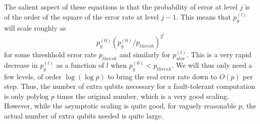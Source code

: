\documentclass{report}
\newcommand{\pgj}[1]{p_g^{({#1})}}
\newcommand{\psj}[1]{p_{stor}^{({#1})}}
\begin{document}
The salient aspect of these equations is that the probability of error at 
level $j$ is of the order of the square of the error rate at level $j-1$.  This 
means that $\pgj{l}$ will scale roughly as 
\begin{equation}
\pgj{0} (\pgj{0}/p_{thresh})^{2^l}
\end{equation}
for some threshhold error rate $p_{thresh}$ and 
similarly for $\psj{l}$.  This is a very rapid decrease in $\pgj{l}$ as a 
function of $l$ when $\pgj{0} < p_{thresh}$.  We will thus only need a few 
levels, of order $\log (\log p)$ to bring the real error rate down to $O(p)$ 
per step.  Thus, the number of extra qubits necessary for a fault-tolerant 
computation is only $\mbox{polylog } p$ times the original number, which 
is a very good scaling.  However, while the asymptotic scaling is quite good, 
for vaguely reasonable $p$, the actual number of extra qubits needed is 
quite large.
\end{document}
